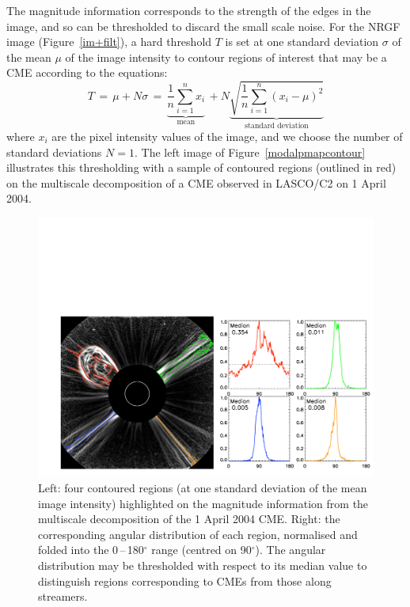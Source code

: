\documentclass[namedreferences]{SolarPhysics}
\begin{document}
\begin{article}
The magnitude information corresponds to the strength of the edges in the image, and so can be thresholded to discard the small scale noise. For the NRGF image (Figure~\ref{im+filt}), a hard threshold $T$ is set at one standard deviation $\sigma$ of the mean $\mu$ of the image intensity to contour regions of interest that may be a CME according to the equations:
\begin{equation}
T \,=\, \mu + N \sigma \,=\, \underbrace{ \frac{1}{n}\sum_{i=1}^n x_i}_{\mbox{mean}} \,+ N \underbrace{ \sqrt{ \frac{1}{n} \sum_{i=1}^n \left( x_i - \mu \right) ^2 } }_{\mbox{standard deviation}}
\label{eqn:threshold}
\end{equation}
where $x_i$ are the pixel intensity values of the image, and we choose the number of standard deviations $N=1$. The left image of Figure~\ref{modalpmapcontour} illustrates this thresholding with a sample of contoured regions (outlined in red) on the multiscale decomposition of a CME observed in LASCO/C2 on 1 April 2004.
\begin{figure}[!t]
\centerline{\includegraphics[scale=0.55, clip=true, trim=40 20 0 230]{images/colour_contours_distributions.pdf}}
\caption{Left: four contoured regions (at one standard deviation of the mean image intensity) highlighted on the magnitude information from the multiscale decomposition of the 1 April 2004 CME. Right: the corresponding angular distribution of each region, normalised and folded into the 0\,--\,180$^{\circ}$ range (centred on 90$^{\circ}$). The angular distribution may be thresholded with respect to its median value to distinguish regions corresponding to CMEs from those along streamers.}
\label{ccdistributions}
\end{figure}


\end{article}
\end{document}
